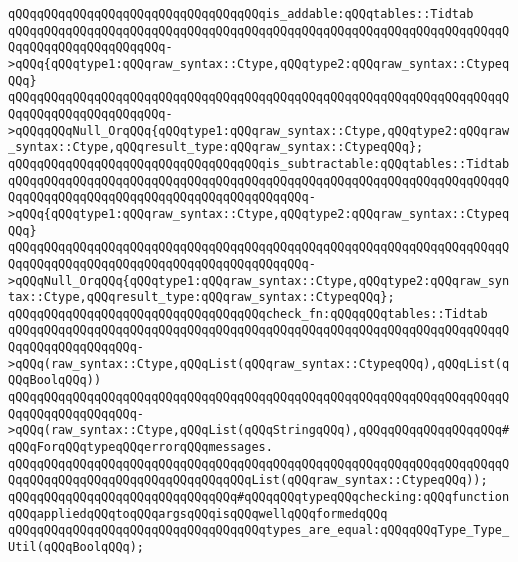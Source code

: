 \newline
\verb|qQQqqQQqqQQqqQQqqQQqqQQqqQQqqQQqqQQqis_addable:qQQqtables::Tidtab|\newline
\verb|qQQqqQQqqQQqqQQqqQQqqQQqqQQqqQQqqQQqqQQqqQQqqQQqqQQqqQQqqQQqqQQqqQQqqQQqqQQqqQQqqQQqqQQqqQQq->qQQq{qQQqtype1:qQQqraw_syntax::Ctype,qQQqtype2:qQQqraw_syntax::CtypeqQQq}|\newline
\verb|qQQqqQQqqQQqqQQqqQQqqQQqqQQqqQQqqQQqqQQqqQQqqQQqqQQqqQQqqQQqqQQqqQQqqQQqqQQqqQQqqQQqqQQqqQQq->qQQqqQQqNull_OrqQQq{qQQqtype1:qQQqraw_syntax::Ctype,qQQqtype2:qQQqraw_syntax::Ctype,qQQqresult_type:qQQqraw_syntax::CtypeqQQq};|\newline
\newline
\verb|qQQqqQQqqQQqqQQqqQQqqQQqqQQqqQQqqQQqis_subtractable:qQQqtables::Tidtab|\newline
\verb|qQQqqQQqqQQqqQQqqQQqqQQqqQQqqQQqqQQqqQQqqQQqqQQqqQQqqQQqqQQqqQQqqQQqqQQqqQQqqQQqqQQqqQQqqQQqqQQqqQQqqQQqqQQqqQQq->qQQq{qQQqtype1:qQQqraw_syntax::Ctype,qQQqtype2:qQQqraw_syntax::CtypeqQQq}|\newline
\verb|qQQqqQQqqQQqqQQqqQQqqQQqqQQqqQQqqQQqqQQqqQQqqQQqqQQqqQQqqQQqqQQqqQQqqQQqqQQqqQQqqQQqqQQqqQQqqQQqqQQqqQQqqQQqqQQq->qQQqNull_OrqQQq{qQQqtype1:qQQqraw_syntax::Ctype,qQQqtype2:qQQqraw_syntax::Ctype,qQQqresult_type:qQQqraw_syntax::CtypeqQQq};|\newline
\newline
\verb|qQQqqQQqqQQqqQQqqQQqqQQqqQQqqQQqqQQqcheck_fn:qQQqqQQqtables::Tidtab|\newline
\verb|qQQqqQQqqQQqqQQqqQQqqQQqqQQqqQQqqQQqqQQqqQQqqQQqqQQqqQQqqQQqqQQqqQQqqQQqqQQqqQQqqQQqqQQq->qQQq(raw_syntax::Ctype,qQQqList(qQQqraw_syntax::CtypeqQQq),qQQqList(qQQqBoolqQQq))|\newline
\verb|qQQqqQQqqQQqqQQqqQQqqQQqqQQqqQQqqQQqqQQqqQQqqQQqqQQqqQQqqQQqqQQqqQQqqQQqqQQqqQQqqQQqqQQq->qQQq(raw_syntax::Ctype,qQQqList(qQQqStringqQQq),qQQqqQQqqQQqqQQqqQQq#qQQqForqQQqtypeqQQqerrorqQQqmessages.|\newline
\verb|qQQqqQQqqQQqqQQqqQQqqQQqqQQqqQQqqQQqqQQqqQQqqQQqqQQqqQQqqQQqqQQqqQQqqQQqqQQqqQQqqQQqqQQqqQQqqQQqqQQqqQQqList(qQQqraw_syntax::CtypeqQQq));|\newline
\newline
\verb|qQQqqQQqqQQqqQQqqQQqqQQqqQQqqQQq#qQQqqQQqtypeqQQqchecking:qQQqfunctionqQQqappliedqQQqtoqQQqargsqQQqisqQQqwellqQQqformedqQQq|\newline
\newline
\verb|qQQqqQQqqQQqqQQqqQQqqQQqqQQqqQQqqQQqtypes_are_equal:qQQqqQQqType_Type_Util(qQQqBoolqQQq);|\newline
